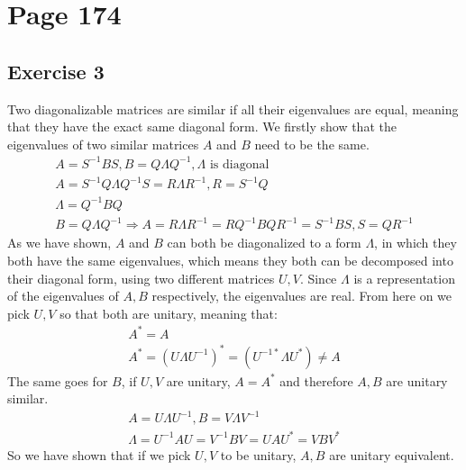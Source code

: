 

\section{Page 174}
\subsection{Exercise 3}
Two diagonalizable matrices are similar if all their eigenvalues are equal, meaning that they have the exact same diagonal form. We firstly show that the eigenvalues of two similar matrices $A$ and $B$ need to be the same.
\begin{gather*}
A = S^{-1}B S , B = Q \Lambda Q^{-1} , \Lambda \text{ is diagonal } \\
A = S^{-1} Q \Lambda Q^{-1} S = R \Lambda R^{-1} , R = S^{-1} Q \\
\Lambda = Q^{-1} B Q \\
B = Q \Lambda Q^{-1} \Rightarrow A = R \Lambda R^{-1} = R Q^{-1} B Q R^{-1} = S^{-1} B S , S = Q R^{-1}
\end{gather*}
As we have shown, $A$ and $B$ can both be diagonalized to a form $\Lambda$, in which they both have the same eigenvalues, which means they both can be decomposed into their diagonal form, using two different matrices $U,V$.
Since $\Lambda$ is a representation of the eigenvalues of $A,B$ respectively, the eigenvalues are real.
From here on we pick $U,V$ so that both are unitary, meaning that:
\begin{gather*}
A^* = A \\
A^* = (U \Lambda U^{-1})^{*} = (U^{-1*} \Lambda U^{*}) \neq A
\end{gather*}
The same goes for $B$, if $U,V$ are unitary, $A = A^*$ and therefore $A,B$ are unitary similar.
\begin{gather*}
A = U \Lambda U^{-1}, B = V \Lambda V^{-1}\\
\Lambda = U^{-1} A U = V^{-1} B V = U A U ^{*} = V B V^{*}
\end{gather*}
So we have shown that if we pick $U,V$ to be unitary, $A,B$ are unitary equivalent.

